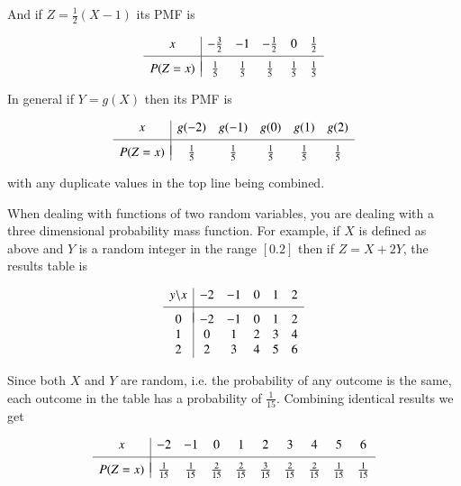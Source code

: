 \documentclass[a5paper]{article}
\begin{document}
\noindent And if $Z = \frac{1}{2}(X - 1)$ its PMF is

\begin{equation}
  \begin{array}{c|ccccc}
    x & -\frac{3}{2} & -1 & -\frac{1}{2} & 0 & \frac{1}{2} \\[3pt]
    \hline \\[-8pt]
    P(Z=x) & \frac{1}{5} & \frac{1}{5} & \frac{1}{5} & \frac{1}{5} & \frac{1}{5}
  \end{array}
\end{equation}

\noindent In general if $Y = g(X)$ then its PMF is

\begin{equation}
  \begin{array}{c|ccccc}
    x & g(-2) & g(-1) & g(0) & g(1) & g(2) \\[3pt]
    \hline \\[-8pt]
    P(Z=x) & \frac{1}{5} & \frac{1}{5} & \frac{1}{5} & \frac{1}{5} & \frac{1}{5}
  \end{array}
\end{equation}

with any duplicate values in the top line being combined.

When dealing with functions of two random variables, you are dealing with a
three dimensional probability mass function. For example, if $X$ is defined as
above and $Y$ is a random integer in the range $[0.2]$ then if $Z = X + 2Y$, the
results table is

\begin{equation}
  \begin{array}{c|ccccc}
    y\backslash x & -2 & -1 & 0 & 1 & 2 \\[3pt]
    \hline \\[-8pt]
    0 & -2 & -1 & 0 & 1 & 2\\
    1 & 0 & 1 & 2 & 3 & 4\\
    2 & 2 & 3 & 4 & 5 & 6\\
  \end{array}
\end{equation}

Since both $X$ and $Y$ are random, i.e. the probability of any outcome is the
same, each outcome in the table has a probability of $\frac{1}{15}$. Combining
identical results we get

\begin{equation}
  \begin{array}{c|ccccccccc}
    x & -2 & -1 & 0 & 1 & 2 & 3 & 4 & 5 & 6\\[3pt]
    \hline \\[-8pt]
    P(Z=x) & \frac{1}{15} & \frac{1}{15} & \frac{2}{15} & \frac{2}{15} & \frac{3}{15}
    & \frac{2}{15} & \frac{2}{15} & \frac{1}{15} & \frac{1}{15}
  \end{array}
\end{equation}
\end{document}
